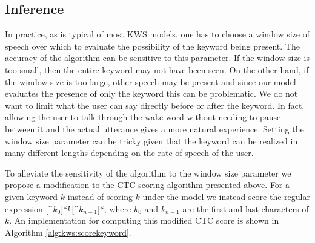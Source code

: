 \subsection{Inference}

In practice, as is typical of most KWS models, one has to choose a window size
of speech over which to evaluate the possibility of the keyword being present.
The accuracy of the algorithm can be sensitive to this parameter. If the window
size is too small, then the entire keyword may not have been seen. On the other
hand, if the window size is too large, other speech may be present and since
our model evaluates the presence of only the keyword this can be problematic.
We do not want to limit what the user can say directly before or after the
keyword. In fact, allowing the user to talk-through the wake word without
needing to pause between it and the actual utterance gives a more natural
experience. Setting the window size parameter can be tricky given that the
keyword can be realized in many different lengths depending on the rate of
speech of the user.

To alleviate the sensitivity of the algorithm to the window size parameter we
propose a modification to the CTC scoring algorithm presented above. For a
given keyword $k$ instead of scoring $k$ under the model we instead score the
regular expression [\^{}$k_0$]*$k$[\^{}$k_{n-1}$]*, where $k_0$ and $k_{n-1}$
are the first and last characters of $k$. An implementation for computing this
modified CTC score is shown in Algorithm \ref{alg:kws:scorekeyword}.

%            

